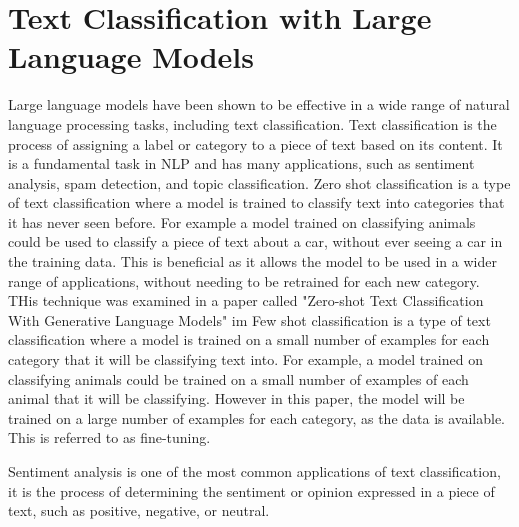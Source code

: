 \documentclass{UoYCSproject}
\begin{document}
    \section{Text Classification with Large Language Models}
    \label{sec:text-classification}
    Large language models have been shown to be effective in a wide range of natural language processing tasks, including text classification.
    Text classification is the process of assigning a label or category to a piece of text based on its content.
    It is a fundamental task in NLP and has many applications, such as sentiment analysis, spam detection, and topic classification.
    Zero shot classification is a type of text classification where a model is trained to classify text into categories that it has never seen before. For example a model trained on classifying animals could be used to classify a piece of text about a car, without ever seeing a car in the training data. This is beneficial as it allows the model to be used in a wider range of applications, without needing to be retrained for each new category. THis technique was examined in a paper called "Zero-shot Text Classification With Generative Language Models" im
    Few shot classification is a type of text classification where a model is trained on a small number of examples for each category that it will be classifying text into. For example, a model trained on classifying animals could be trained on a small number of examples of each animal that it will be classifying.
    However in this paper, the model will be trained on a large number of examples for each category, as the data is available. This is referred to as fine-tuning. \par
     Sentiment analysis is one of the most common applications of text classification, it is the process of determining the sentiment or opinion expressed in a piece of text, such as positive, negative, or neutral.
\end{document}
